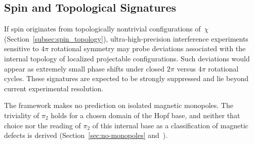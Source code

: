 \subsection{Spin and Topological Signatures}
  \label{subsec:spin-and-topological-signatures}

  If spin originates from topologically nontrivial configurations of~$\chi$
  (Section~\ref{subsec:spin_topology}), ultra-high-precision interference
  experiments sensitive to $4\pi$ rotational symmetry may probe deviations
  associated with the internal topology of localized projectable
  configurations.
  Such deviations would appear as extremely small phase shifts under closed
  $2\pi$ versus $4\pi$ rotational cycles.
  These signatures are expected to be strongly suppressed and lie beyond
  current experimental resolution.

  The framework makes no prediction on isolated magnetic monopoles.
  The triviality of $\pi_2$ holds for a chosen domain of the Hopf base, and neither that choice nor
  the reading of $\pi_2$ of this internal base as a classification of magnetic defects is derived
  (Section~\ref{sec:no-monopoles} and~\cite{Beau2026k}).
